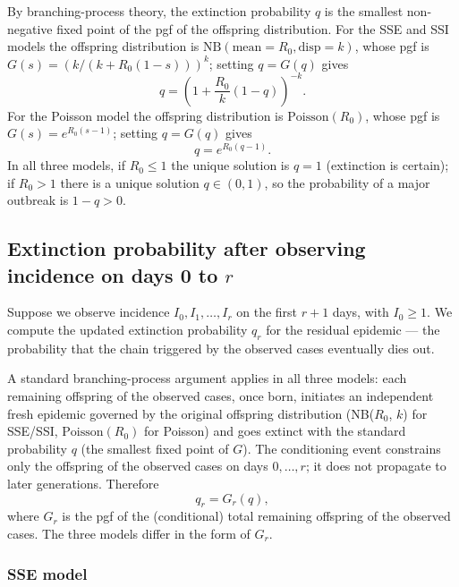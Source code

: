 \documentclass{article}
\theoremstyle{definition}
\begin{document}
By branching-process theory, the extinction probability $q$ is the smallest
non-negative fixed point of the pgf of the offspring distribution.  For the
SSE and SSI models the offspring distribution is
$\mathrm{NB}(\text{mean} = R_0, \text{disp} = k)$, whose pgf is
$G(s) = (k/(k + R_0(1-s)))^k$; setting $q = G(q)$ gives
\begin{equation}\label{eq:q_nb}
  q = \left(1 + \frac{R_0}{k}(1 - q)\right)^{-k}.
\end{equation}
For the Poisson model the offspring distribution is
$\mathrm{Poisson}(R_0)$, whose pgf is $G(s) = e^{R_0(s - 1)}$; setting
$q = G(q)$ gives
\begin{equation}\label{eq:q_poisson}
  q = e^{R_0(q - 1)}.
\end{equation}
In all three models, if $R_0 \leq 1$ the unique solution is $q = 1$
(extinction is certain); if $R_0 > 1$ there is a unique solution
$q \in (0,1)$, so the probability of a major outbreak is $1 - q > 0$.

\subsection{Extinction probability after observing incidence on days 0 to \(r\)}
\label{sec:qr}

Suppose we observe incidence $I_0, I_1, \ldots, I_r$ on the first $r+1$
days, with $I_0 \geq 1$.  We compute the updated extinction probability
$q_r$ for the residual epidemic — the probability that the chain triggered
by the observed cases eventually dies out.

A standard branching-process argument applies in all three models: each
remaining offspring of the observed cases, once born, initiates an
independent fresh epidemic governed by the original offspring
distribution (NB($R_0$, $k$) for SSE/SSI, $\mathrm{Poisson}(R_0)$ for
Poisson) and goes extinct with the standard probability $q$ (the
smallest fixed point of $G$).  The conditioning event constrains only
the offspring of the observed cases on days $0, \ldots, r$; it does not
propagate to later generations.  Therefore
\[
  q_r = G_r(q),
\]
where $G_r$ is the pgf of the (conditional) total remaining offspring of
the observed cases.  The three models differ in the form of $G_r$.

\subsubsection{SSE model}
\label{sec:qr_sse}
\end{document}
